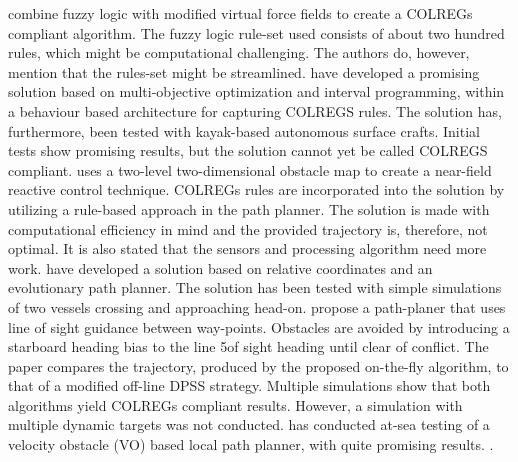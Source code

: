 \textcite{lee2004fuzzy} combine fuzzy logic with modified virtual force fields to  create a COLREGs compliant algorithm. The fuzzy logic rule-set used consists of about two hundred rules, which might be computational challenging. The authors do, however, mention that the rules-set might be streamlined.
\textcite{benjamin2004colregs,benjamin2006method} have developed a promising solution based on  multi-objective optimization and interval programming, within a behaviour based architecture for capturing COLREGS rules. The solution has, furthermore, been tested with kayak-based autonomous surface crafts. Initial tests show promising results, but the solution cannot yet be called COLREGS compliant.
\textcite{larson2007advances} uses a two-level two-dimensional obstacle map to create a near-field reactive control technique. COLREGs rules are incorporated into the solution by utilizing a rule-based approach in the path planner. The solution is made with computational efficiency in mind and the provided trajectory is, therefore, not optimal. It is also stated that the sensors and processing algorithm need more work.
\textcite{zhuang2011motion} 
have developed a solution based on relative coordinates and an evolutionary path planner. The solution has been tested with simple simulations of two vessels crossing and approaching head-on.
\textcite{naeem2012colregs}
propose a path-planer that uses line of sight guidance between way-points. Obstacles are avoided by introducing a starboard heading bias to the line 5of sight heading until clear of conflict. The paper compares the trajectory, produced by the proposed on-the-fly algorithm, to that of a modified off-line DPSS strategy. Multiple simulations show that both algorithms yield COLREGs compliant results. However, a simulation with multiple dynamic targets was not conducted.
\textcite{kuwata2014safe} has conducted at-sea testing of a velocity obstacle (VO) based local path planner, with quite promising results.
.



